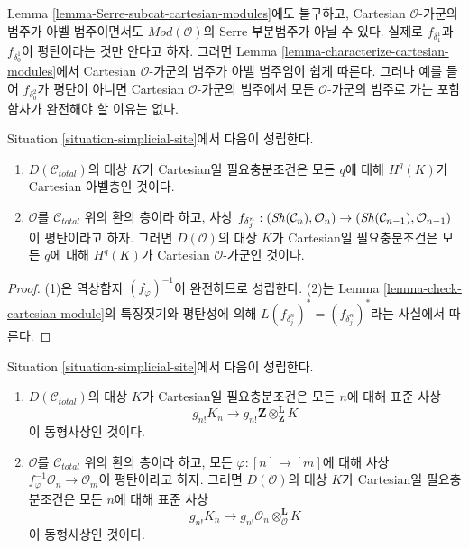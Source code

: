 \begin{remark}[경고]
\label{remark-warning-cartesian-modules}
Lemma \ref{lemma-Serre-subcat-cartesian-modules}에도 불구하고,
Cartesian $\mathcal{O}$-가군의 범주가 아벨 범주이면서도
$\textit{Mod}(\mathcal{O})$의 Serre 부분범주가 아닐 수 있다.
실제로 $f_{\delta_1^1}$과 $f_{\delta_0^1}$이 평탄이라는 것만 안다고 하자.
그러면 Lemma \ref{lemma-characterize-cartesian-modules}에서
Cartesian $\mathcal{O}$-가군의 범주가 아벨 범주임이 쉽게 따른다.
그러나 예를 들어 $f_{\delta_0^2}$가 평탄이 아니면
Cartesian $\mathcal{O}$-가군의 범주에서 모든
$\mathcal{O}$-가군의 범주로 가는 포함함자가 완전해야 할 이유는 없다.
\end{remark}

\begin{lemma}
\label{lemma-derived-cartesian-modules}
Situation \ref{situation-simplicial-site}에서 다음이 성립한다.
\begin{enumerate}
\item $D(\mathcal{C}_{total})$의 대상 $K$가 Cartesian일 필요충분조건은
모든 $q$에 대해 $H^q(K)$가 Cartesian 아벨층인 것이다.
\item $\mathcal{O}$를 $\mathcal{C}_{total}$ 위의 환의 층이라 하고,
사상\newline
$f_{\delta^n_j} : (\mathop{\mathit{Sh}}\nolimits(\mathcal{C}_n), \mathcal{O}_n)
\to (\mathop{\mathit{Sh}}\nolimits(\mathcal{C}_{n - 1}), \mathcal{O}_{n - 1})$이 평탄이라고 하자.
그러면 $D(\mathcal{O})$의 대상 $K$가 Cartesian일 필요충분조건은
모든 $q$에 대해 $H^q(K)$가 Cartesian $\mathcal{O}$-가군인 것이다.
\end{enumerate}
\end{lemma}

\begin{proof}
(1)은 역상함자 $(f_\varphi)^{-1}$이 완전하므로 성립한다.
(2)는 Lemma \ref{lemma-check-cartesian-module}의 특징짓기와
평탄성에 의해
$L(f_{\delta^n_j})^* = (f_{\delta^n_j})^*$라는 사실에서 따른다.
\end{proof}

\begin{lemma}
\label{lemma-derived-cartesian-shriek}
Situation \ref{situation-simplicial-site}에서 다음이 성립한다.
\begin{enumerate}
\item $D(\mathcal{C}_{total})$의 대상 $K$가 Cartesian일 필요충분조건은
모든 $n$에 대해 표준 사상
$$
g_{n!}K_n \longrightarrow
g_{n!}\mathbf{Z} \otimes^\mathbf{L}_\mathbf{Z} K
$$
이 동형사상인 것이다.
\item $\mathcal{O}$를 $\mathcal{C}_{total}$ 위의 환의 층이라 하고,
모든 $\varphi : [n] \to [m]$에 대해 사상
$f_\varphi^{-1}\mathcal{O}_n \to \mathcal{O}_m$이 평탄이라고 하자.
그러면 $D(\mathcal{O})$의 대상 $K$가 Cartesian일 필요충분조건은
모든 $n$에 대해 표준 사상
$$
g_{n!}K_n \longrightarrow
g_{n!}\mathcal{O}_n \otimes^\mathbf{L}_\mathcal{O} K
$$
이 동형사상인 것이다.
\end{enumerate}
\end{lemma}

